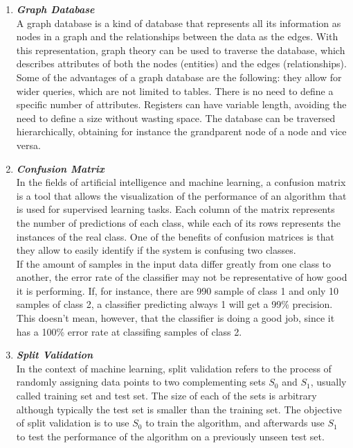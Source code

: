 \documentclass{article}
\begin{document}
\begin{enumerate}[label=(\alph*)]
\begin{enumerate}[label=\textbf{\arabic*.}]
            \item \textbf{\textit{Graph Database}}\\
A graph database is a kind of database that represents all its information as nodes in a graph and the relationships between the data as the edges. With this representation, graph theory can be used to traverse the database, which describes attributes of both the nodes (entities) and the edges (relationships).\\
Some of the advantages of a graph database are the following: they allow for wider queries, which are not limited to tables. There is no need to define a specific number of attributes. Registers can have variable length, avoiding the need to define a size without wasting space. The database can be traversed hierarchically, obtaining for instance the grandparent node of a node and vice versa. 
            
            \item \textbf{\textit{Confusion Matrix}}\\
In the fields of artificial intelligence and machine learning, a confusion matrix is a tool that allows the visualization of the performance of an algorithm that is used for supervised learning tasks. Each column of the matrix represents the number of predictions of each class, while each of its rows represents the instances of the real class. One of the benefits of confusion matrices is that they allow to easily identify if the system is confusing two classes.\\
If the amount of samples in the input data differ greatly from one class to another, the error rate of the classifier may not be representative of how good it is performing. If, for instance, there are 990 sample of class 1 and only 10 samples of class 2, a classifier predicting always 1 will get a 99\% precision. This doesn't mean, however, that the classifier is doing a good job, since it has a 100\% error rate at classifing samples of class 2. 
            
            \item \textbf{\textit{Split Validation}}\\
In the context of machine learning, split validation refers to the process of randomly assigning data points to two complementing sets $S_0$ and $S_1$, usually called training set and test set. The size of each of the sets is arbitrary although typically the test set is smaller than the training set. The objective of split validation is to use $S_0$ to train the algorithm, and afterwards use $S_1$ to test the performance of the algorithm on a previously unseen test set.  
            

\end{enumerate}
\end{enumerate}
\end{document}
